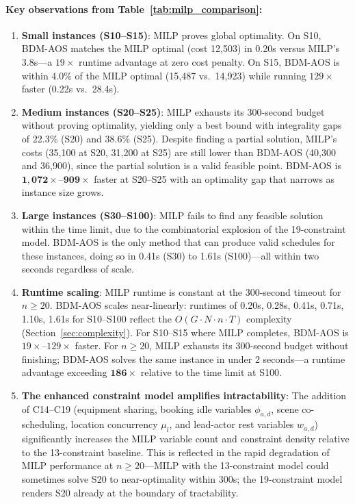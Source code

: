 \paragraph{Key observations from Table~\ref{tab:milp_comparison}:}
\begin{enumerate}
    \item \textbf{Small instances (S10--S15)}: MILP proves global optimality. On S10, BDM-AOS matches the MILP optimal (cost 12,503) in 0.20s versus MILP's 3.8s---a $19\times$ runtime advantage at zero cost penalty.
    On S15, BDM-AOS is within 4.0\% of the MILP optimal (15,487 vs.\ 14,923) while running $129\times$ faster (0.22s vs.\ 28.4s).

    \item \textbf{Medium instances (S20--S25)}: MILP exhausts its 300-second budget without proving optimality, yielding only a best bound with integrality gaps of 22.3\% (S20) and 38.6\% (S25).
    Despite finding a partial solution, MILP's costs (35,100 at S20, 31,200 at S25) are still lower than BDM-AOS (40,300 and 36,900), since the partial solution is a valid feasible point.
    BDM-AOS is $\mathbf{1{,}072\times}$--$\mathbf{909\times}$ faster at S20--S25 with an optimality gap that narrows as instance size grows.

    \item \textbf{Large instances (S30--S100)}: MILP fails to find any feasible solution within the time limit, due to the combinatorial explosion of the 19-constraint model.
    BDM-AOS is the only method that can produce valid schedules for these instances, doing so in 0.41s (S30) to 1.61s (S100)---all within two seconds regardless of scale.

    \item \textbf{Runtime scaling}: MILP runtime is constant at the 300-second timeout for $n \geq 20$.
    BDM-AOS scales near-linearly: runtimes of 0.20s, 0.28s, 0.41s, 0.71s, 1.10s, 1.61s for S10--S100 reflect the $O(G \cdot N \cdot n \cdot T)$ complexity (Section~\ref{sec:complexity}).
    For S10--S15 where MILP completes, BDM-AOS is $19\times$--$129\times$ faster.
    For $n \geq 20$, MILP exhausts its 300-second budget without finishing; BDM-AOS solves the same instance in under 2 seconds---a runtime advantage exceeding $\mathbf{186\times}$ relative to the time limit at S100.

    \item \textbf{The enhanced constraint model amplifies intractability}: The addition of C14--C19 (equipment sharing, booking idle variables $\phi_{a,d}$, scene co-scheduling, location concurrency $\mu_l$, and lead-actor rest variables $w_{a,d}$) significantly increases the MILP variable count and constraint density relative to the 13-constraint baseline.
    This is reflected in the rapid degradation of MILP performance at $n \geq 20$---MILP with the 13-constraint model could sometimes solve S20 to near-optimality within 300s; the 19-constraint model renders S20 already at the boundary of tractability.
\end{enumerate}

